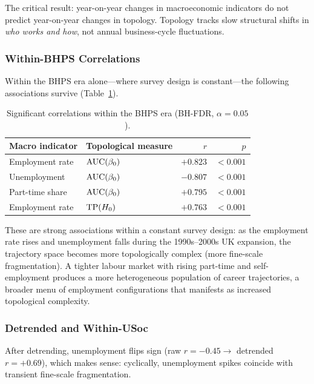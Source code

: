 The critical result: year-on-year changes in macroeconomic indicators do not
predict year-on-year changes in topology.
Topology tracks slow structural shifts in \emph{who works and how}, not annual
business-cycle fluctuations.

\subsubsection{Within-BHPS Correlations}

Within the BHPS era alone---where survey design is constant---the following
associations survive (Table~\ref{tab:within_bhps}).

\begin{table}[htbp]
  \centering
  \caption{Significant correlations within the BHPS era (BH-FDR, $\alpha = 0.05$).}
  \label{tab:within_bhps}
  \begin{tabular}{llrr}
    \toprule
    Macro indicator & Topological measure & $r$ & $p$ \\
    \midrule
    Employment rate & $\mathrm{AUC}(\beta_0)$ & $+0.823$ & $< 0.001$ \\
    Unemployment    & $\mathrm{AUC}(\beta_0)$ & $-0.807$ & $< 0.001$ \\
    Part-time share & $\mathrm{AUC}(\beta_0)$ & $+0.795$ & $< 0.001$ \\
    Employment rate & $\mathrm{TP}(H_{0})$   & $+0.763$ & $< 0.001$ \\
    \bottomrule
  \end{tabular}
\end{table}

These are strong associations within a constant survey design: as the employment
rate rises and unemployment falls during the 1990s--2000s UK expansion, the
trajectory space becomes more topologically complex (more fine-scale
fragmentation).
A tighter labour market with rising part-time and self-employment produces a more
heterogeneous population of career trajectories, a broader menu of employment
configurations that manifests as increased topological complexity.

\subsubsection{Detrended and Within-USoc}

After detrending, unemployment flips sign (raw $r = -0.45 \to$ detrended
$r = +0.69$), which makes sense: cyclically, unemployment spikes coincide with
transient fine-scale fragmentation.


